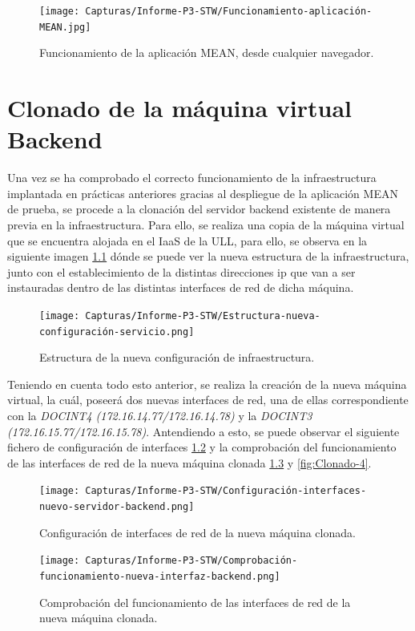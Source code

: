 \documentclass{report}
\begin{document}
  \begin{figure}[H]
    \raggedright
    \texttt{[image: Capturas/Informe-P3-STW/Funcionamiento-aplicación-MEAN.jpg]}
    \caption{Funcionamiento de la aplicación MEAN, desde cualquier navegador.}
    \label{fig:Funcionamiento-2}
  \end{figure}

	\chapter{Clonado de la máquina virtual Backend}
  Una vez se ha comprobado el correcto funcionamiento de la infraestructura implantada en prácticas anteriores gracias al despliegue de la aplicación MEAN de prueba, se procede a la clonación del servidor backend existente de manera previa en la infraestructura. Para ello, se realiza una copia de la máquina virtual que se encuentra alojada en el IaaS de la ULL, para ello, se observa en la siguiente imagen \ref{fig:Clonado-1} dónde se puede ver la nueva estructura de la infraestructura, junto con el establecimiento de la distintas direcciones ip que van a ser instauradas dentro de las distintas interfaces de red de dicha máquina.

  \begin{figure}[H]
    \centering
    \texttt{[image: Capturas/Informe-P3-STW/Estructura-nueva-configuración-servicio.png]}
    \caption{Estructura de la nueva configuración de infraestructura.}
    \label{fig:Clonado-1}
  \end{figure}

  Teniendo en cuenta todo esto anterior, se realiza la creación de la nueva máquina virtual, la cuál, poseerá dos nuevas interfaces de red, una de ellas correspondiente con la \emph{DOCINT4 (172.16.14.77/172.16.14.78)} y la \emph{DOCINT3 (172.16.15.77/172.16.15.78)}. Antendiendo a esto, se puede observar el siguiente fichero de configuración de interfaces \ref{fig:Clonado-2} y la comprobación del funcionamiento de las interfaces de red de la nueva máquina clonada \ref{fig:Clonado-3} y \ref{fig:Clonado-4}.

  \begin{figure}[H]
    \centering
    \texttt{[image: Capturas/Informe-P3-STW/Configuración-interfaces-nuevo-servidor-backend.png]}
    \caption{Configuración de interfaces de red de la nueva máquina clonada.}
    \label{fig:Clonado-2}
  \end{figure}

  \begin{figure}[H]
    \centering
    \texttt{[image: Capturas/Informe-P3-STW/Comprobación-funcionamiento-nueva-interfaz-backend.png]}
    \caption{Comprobación del funcionamiento de las interfaces de red de la nueva máquina clonada.}
    \label{fig:Clonado-3}
  \end{figure}
\end{document}
